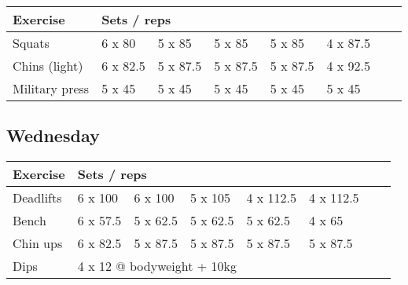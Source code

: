 \documentclass[12pt, a4paper]{article}%
\begin{document}
  \begin{tabular}{l|lllllll}
  \hspace{0.75em} \textbf{Exercise} & \multicolumn{ 7 }{l}{ \textbf{Sets / reps} } \\ \hline

            \hspace{0.75em} Squats
            & 6 x 80
            & 5 x 85
            & 5 x 85
            & 5 x 85
            & 4 x 87.5
            & 
            & 
            \\


            \hspace{0.75em} Chins (light)
            & 6 x 82.5
            & 5 x 87.5
            & 5 x 87.5
            & 5 x 87.5
            & 4 x 92.5
            & 
            & 
            \\


            \hspace{0.75em} Military press
            & 5 x 45
            & 5 x 45
            & 5 x 45
            & 5 x 45
            & 5 x 45
            & 
            & 
            \\


  \end{tabular}

  \subsection*{\hspace{0.5em} Wednesday }


  \begin{tabular}{l|lllllll}
  \hspace{0.75em} \textbf{Exercise} & \multicolumn{ 7 }{l}{ \textbf{Sets / reps} } \\ \hline

            \hspace{0.75em} Deadlifts
            & 6 x 100
            & 6 x 100
            & 5 x 105
            & 4 x 112.5
            & 4 x 112.5
            & 
            & 
            \\


            \hspace{0.75em} Bench
            & 6 x 57.5
            & 5 x 62.5
            & 5 x 62.5
            & 5 x 62.5
            & 4 x 65
            & 
            & 
            \\


            \hspace{0.75em} Chin ups
            & 6 x 82.5
            & 5 x 87.5
            & 5 x 87.5
            & 5 x 87.5
            & 5 x 87.5
            & 
            & 
            \\


   \hspace{0.75em} Dips &  \multicolumn{ 7 }{l}{ 4 x 12 @ bodyweight + 10kg } \\
  \end{tabular}
\end{document}
